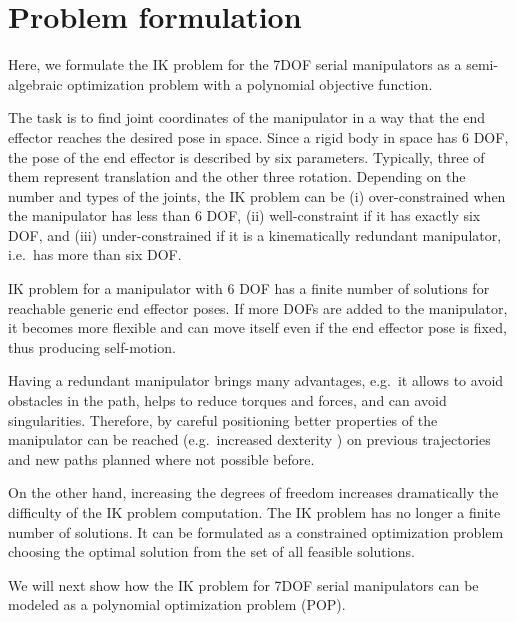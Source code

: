\section{Problem formulation}
Here, we formulate the IK problem for the 7DOF serial manipulators as a semi-algebraic optimization problem with a polynomial objective function.

The task is to find joint coordinates of the manipulator in a way that the end effector reaches the desired pose in space. Since a rigid body in space has 6 DOF, the pose of the end effector is described by six parameters. Typically, three of them represent translation and the other three rotation. Depending on the number and types of the joints, the IK problem can be (i) over-constrained when the manipulator has less than 6 DOF, (ii) well-constraint if it has exactly six DOF, and (iii) under-constrained if it is a kinematically redundant manipulator, i.e.\ has more than six DOF.

IK problem for a manipulator with 6 DOF has a finite number of solutions for reachable generic end effector poses. If more DOFs are added to the manipulator, it becomes more flexible and can move itself even if the end effector pose is fixed, thus producing self-motion.

Having a redundant manipulator brings many advantages, e.g.\ it allows to avoid obstacles in the path, helps to reduce torques and forces, and can avoid singularities. Therefore, by careful positioning better properties of the manipulator can be reached (e.g.\ increased dexterity \cite{Zhou1997}) on previous trajectories and new paths planned where not possible before.

On the other hand, increasing the degrees of freedom increases dramatically the difficulty of the IK problem computation. The IK problem has no longer a finite number of solutions. It can be formulated as a constrained optimization problem choosing the optimal solution from the set of all feasible solutions.

We will next show how the IK problem for 7DOF serial manipulators can be modeled as a polynomial optimization problem (POP).

